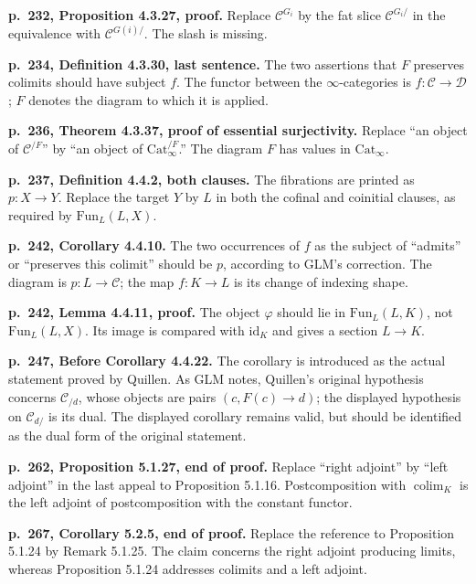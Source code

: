 \par{}
\noindent\textbf{p.~232, Proposition 4.3.27, proof.}\enspace
Replace $\mathcal C^{G_i}$ by the fat slice $\mathcal C^{G_i/}$ in the equivalence with $\mathcal C^{G(i)/}$. The slash is missing.

\par{}
\noindent\textbf{p.~234, Definition 4.3.30, last sentence.}\enspace
The two assertions that $F$ preserves colimits should have subject $f$. The functor between the $\infty$-categories is $f\colon\mathcal C\to\mathcal D$; $F$ denotes the diagram to which it is applied.

\par{}
\noindent\textbf{p.~236, Theorem 4.3.37, proof of essential surjectivity.}\enspace
Replace ``an object of $\mathcal C^{/F}$'' by ``an object of $\mathrm{Cat}_{\infty}^{/F}$.'' The diagram $F$ has values in $\mathrm{Cat}_{\infty}$.

\par{}
\noindent\textbf{p.~237, Definition 4.4.2, both clauses.}\enspace
The fibrations are printed as $p\colon X\to Y$. Replace the target $Y$ by $L$ in both the cofinal and coinitial clauses, as required by $\mathrm{Fun}_L(L,X)$.

\par{}
\noindent\textbf{p.~242, Corollary 4.4.10.}\enspace
The two occurrences of $f$ as the subject of ``admits'' or ``preserves this colimit'' should be $p$, according to GLM's correction. The diagram is $p\colon L\to\mathcal C$; the map $f\colon K\to L$ is its change of indexing shape.

\par{}
\noindent\textbf{p.~242, Lemma 4.4.11, proof.}\enspace
The object $\varphi$ should lie in $\mathrm{Fun}_L(L,K)$, not $\mathrm{Fun}_L(L,X)$. Its image is compared with $\mathrm{id}_K$ and gives a section $L\to K$.

\par{}
\noindent\textbf{p.~247, Before Corollary 4.4.22.}\enspace
The corollary is introduced as the actual statement proved by Quillen. As GLM notes, Quillen's original hypothesis concerns $\mathcal C_{/d}$, whose objects are pairs $(c,F(c)\to d)$; the displayed hypothesis on $\mathcal C_{d/}$ is its dual. The displayed corollary remains valid, but should be identified as the dual form of the original statement.

\par{}
\noindent\textbf{p.~262, Proposition 5.1.27, end of proof.}\enspace
Replace ``right adjoint'' by ``left adjoint'' in the last appeal to Proposition 5.1.16. Postcomposition with $\operatorname{colim}_K$ is the left adjoint of postcomposition with the constant functor.

\par{}
\noindent\textbf{p.~267, Corollary 5.2.5, end of proof.}\enspace
Replace the reference to Proposition 5.1.24 by Remark 5.1.25. The claim concerns the right adjoint producing limits, whereas Proposition 5.1.24 addresses colimits and a left adjoint.
